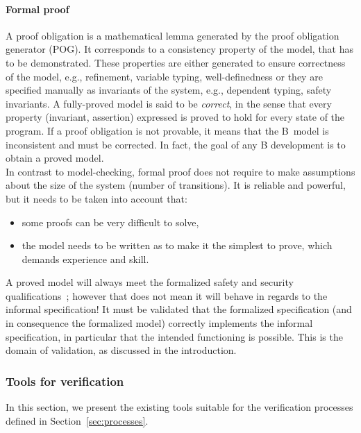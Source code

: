 \paragraph{Formal proof}
A proof obligation is a mathematical lemma generated by the proof obligation
generator (POG). It corresponds to a consistency property of the model, that has
to be demonstrated. These properties are either generated to ensure correctness
of the model, e.g., refinement, variable typing, well-definedness or they are
specified manually as invariants of the system, e.g., dependent typing, safety
invariants. A fully-proved model is said to be \textit{correct}, in the sense
that every property (invariant, assertion) expressed is proved to hold for every
state of the program. If a proof obligation is not provable, it means that the
B~model is inconsistent and must be corrected. In fact, the goal of any B
development is to obtain a proved model.\\
In contrast to model-checking, formal proof does not require to make assumptions
about the size of the system (number of transitions). It is reliable and
powerful, but it needs to be taken into account that:
\begin{itemize}
\item some proofs can be very difficult to solve,
\item the model needs to be written as to make it the simplest to prove, which demands experience and skill.
\end{itemize}
A proved model will always meet the formalized safety and security
qualifications~; however that does not mean it will behave in regards to the
informal specification! It must be validated that the formalized specification
(and in consequence the formalized model) correctly implements the informal
specification, in particular that the intended functioning is possible. This is
the domain of validation, as discussed in the introduction.

\subsubsection{Tools for verification}
\label{sec:tools}

In this section, we present the existing tools suitable for the verification processes defined in Section~\ref{sec:processes}.

